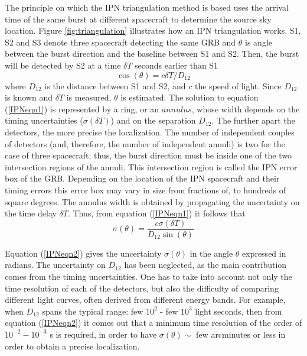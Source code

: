 The principle on which the IPN triangulation method is based uses the arrival time of the same burst at different spacecraft to determine the source sky location. Figure \ref{fig:triangulation} illustrates how an IPN triangulation works. S1, S2 and S3 denote three spacecraft detecting the same GRB and $\theta$ is angle between the burst direction and the baseline between S1 and S2.  Then, the burst will be detected by S2 at a time $\delta T$ seconds earlier than S1 
%
\begin{equation}
\cos (\theta) = c \delta T / D_{12}
\label{IPNeqn1}
\end{equation}
%
where $D_{12}$ is the distance between S1 and S2, and $c$ the speed of light. Since $D_{12}$ is known and $\delta T$ is measured, $\theta$ is estimated. The solution to equation (\ref{IPNeqn1}) is represented by a ring, or an $annulus$, whose width depends on the timing uncertainties ($\sigma(\delta T)$) and on the separation $D_{12}$.  The further apart the detectors, the more precise the localization. The number of independent couples of detectors (and, therefore, the number of independent annuli) is two for the case of three spacecraft; thus, the burst direction must be inside one of the two intersection regions of the annuli. This intersection region is called the IPN error box of the GRB. Depending on the location of the IPN spacecraft and their timing errors this error box may vary in size from fractions of, to hundreds of square degrees. The annulus width is obtained by propagating the uncertainty on the time delay $\delta T$. Thus, from equation (\ref{IPNeqn1}) it follows that
%
\begin{equation}
\sigma(\theta) = \frac{c\sigma (\delta T)}{D_{12} \sin (\theta)}
\label{IPNeqn2}
\end{equation}

Equation (\ref{IPNeqn2}) gives the uncertainty $\sigma(\theta)$ in the angle $\theta$ expressed in radians.  The uncertainty on $D_{12}$ has been neglected, as the main contribution comes from the timing uncertainties. One has to take into account not only the time resolution of each of the detectors, but also the difficulty of comparing different light curves, often derived from different energy bands. For example, when $D_{12}$ spans the typical range: few $10^2$ - few $10^3$ light seconds, then from equation (\ref{IPNeqn2}) it comes out that a minimum time resolution of the order of $10^{-2} - 10^{-3}$ s is required, in order to have $\sigma(\theta) \sim$ few arcminutes or less in order to obtain a precise localization.

